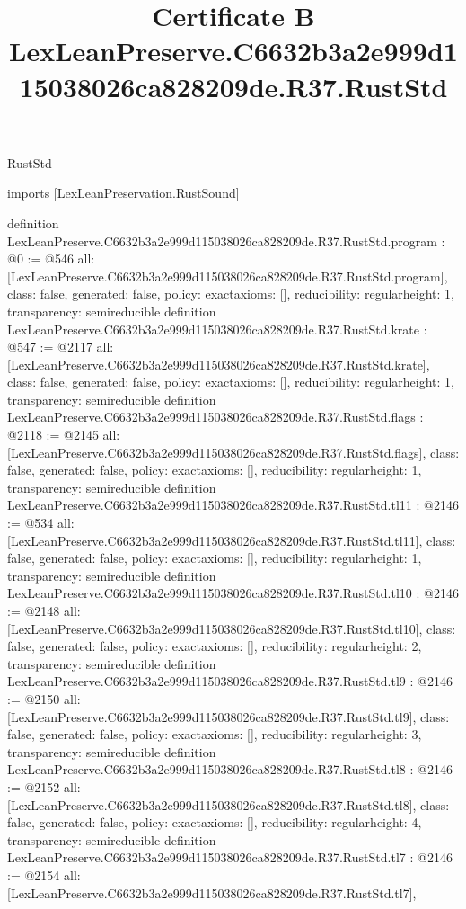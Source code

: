 \begin{lexlean}{RustStd}
\title{Certificate B LexLeanPreserve.C6632b3a2e999d115038026ca828209de.R37.RustStd}
\begin{coremodule}
imports [LexLeanPreservation.RustSound]

definition LexLeanPreserve.C6632b3a2e999d115038026ca828209de.R37.RustStd.program : @0 := @546 {
  all: [LexLeanPreserve.C6632b3a2e999d115038026ca828209de.R37.RustStd.program],
  class: false,
  generated: false,
  policy: exact{axioms: []},
  reducibility: regular{height: 1},
  transparency: semireducible
}
definition LexLeanPreserve.C6632b3a2e999d115038026ca828209de.R37.RustStd.krate : @547 := @2117 {
  all: [LexLeanPreserve.C6632b3a2e999d115038026ca828209de.R37.RustStd.krate],
  class: false,
  generated: false,
  policy: exact{axioms: []},
  reducibility: regular{height: 1},
  transparency: semireducible
}
definition LexLeanPreserve.C6632b3a2e999d115038026ca828209de.R37.RustStd.flags : @2118 := @2145 {
  all: [LexLeanPreserve.C6632b3a2e999d115038026ca828209de.R37.RustStd.flags],
  class: false,
  generated: false,
  policy: exact{axioms: []},
  reducibility: regular{height: 1},
  transparency: semireducible
}
definition LexLeanPreserve.C6632b3a2e999d115038026ca828209de.R37.RustStd.tl11 : @2146 := @534 {
  all: [LexLeanPreserve.C6632b3a2e999d115038026ca828209de.R37.RustStd.tl11],
  class: false,
  generated: false,
  policy: exact{axioms: []},
  reducibility: regular{height: 1},
  transparency: semireducible
}
definition LexLeanPreserve.C6632b3a2e999d115038026ca828209de.R37.RustStd.tl10 : @2146 := @2148 {
  all: [LexLeanPreserve.C6632b3a2e999d115038026ca828209de.R37.RustStd.tl10],
  class: false,
  generated: false,
  policy: exact{axioms: []},
  reducibility: regular{height: 2},
  transparency: semireducible
}
definition LexLeanPreserve.C6632b3a2e999d115038026ca828209de.R37.RustStd.tl9 : @2146 := @2150 {
  all: [LexLeanPreserve.C6632b3a2e999d115038026ca828209de.R37.RustStd.tl9],
  class: false,
  generated: false,
  policy: exact{axioms: []},
  reducibility: regular{height: 3},
  transparency: semireducible
}
definition LexLeanPreserve.C6632b3a2e999d115038026ca828209de.R37.RustStd.tl8 : @2146 := @2152 {
  all: [LexLeanPreserve.C6632b3a2e999d115038026ca828209de.R37.RustStd.tl8],
  class: false,
  generated: false,
  policy: exact{axioms: []},
  reducibility: regular{height: 4},
  transparency: semireducible
}
definition LexLeanPreserve.C6632b3a2e999d115038026ca828209de.R37.RustStd.tl7 : @2146 := @2154 {
  all: [LexLeanPreserve.C6632b3a2e999d115038026ca828209de.R37.RustStd.tl7],
}
\end{coremodule}
\end{lexlean}
